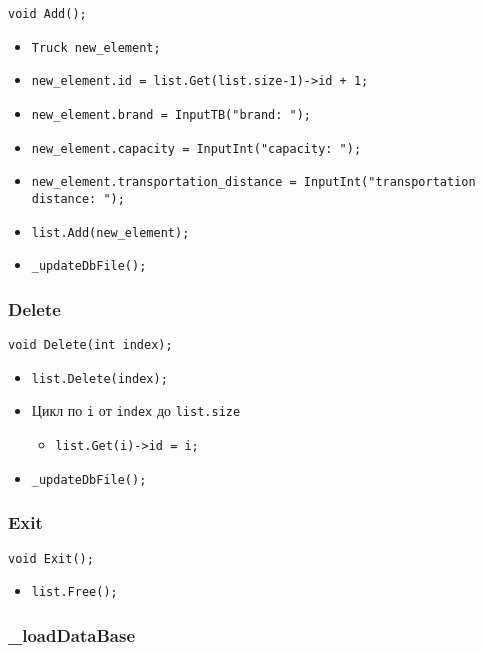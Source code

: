 \begin{lstlisting}
void Add();
\end{lstlisting}

\begin{itemize}
	\item \verb|Truck new_element;|
	\item \verb|new_element.id = list.Get(list.size-1)->id + 1;|
	\item \verb|new_element.brand = InputTB("brand: ");|
	\item \verb|new_element.capacity = InputInt("capacity: ");|
	\item \verb|new_element.transportation_distance = InputInt("transportation distance: ");|
	\item \verb|list.Add(new_element);|
	\item \verb|_updateDbFile();|
\end{itemize}

\subsubsection*{Delete}

\begin{lstlisting}
void Delete(int index);
\end{lstlisting}

\begin{itemize}
	\item \verb|list.Delete(index);|
	\item Цикл по \verb|i| от \verb|index| до \verb|list.size| 
	\begin{itemize}
		\item \verb|list.Get(i)->id = i;|
	\end{itemize}
	\item \verb|_updateDbFile();|
\end{itemize}

\subsubsection*{Exit}

\begin{lstlisting}
void Exit();
\end{lstlisting}

\begin{itemize}
	\item \verb|list.Free();|
\end{itemize}

\subsubsection*{\_loadDataBase}

